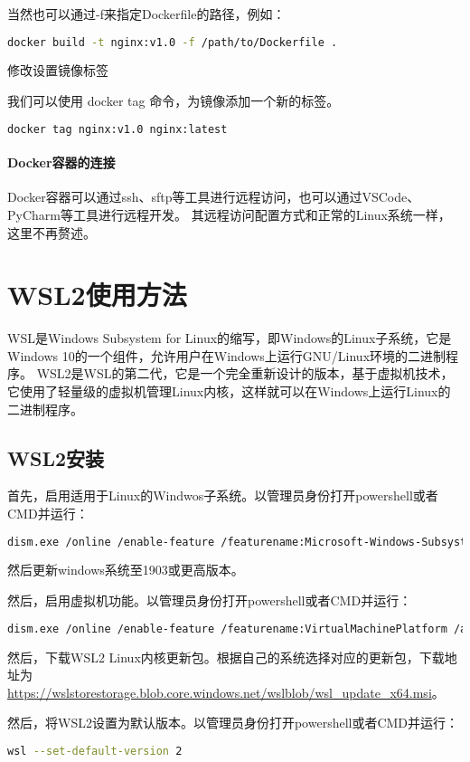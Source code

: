 \documentclass[lang=cn,a4paper,newtx]{elegantpaper}
\begin{document}
当然也可以通过-f来指定Dockerfile的路径，例如：
\begin{lstlisting}[language=bash]
  docker build -t nginx:v1.0 -f /path/to/Dockerfile .
\end{lstlisting}

修改设置镜像标签

我们可以使用 docker tag 命令，为镜像添加一个新的标签。
\begin{lstlisting}[language=bash]
  docker tag nginx:v1.0 nginx:latest
\end{lstlisting}

\paragraph{Docker容器的连接}
Docker容器可以通过ssh、sftp等工具进行远程访问，也可以通过VSCode、PyCharm等工具进行远程开发。
其远程访问配置方式和正常的Linux系统一样，这里不再赘述。
\section{WSL2使用方法}
WSL是Windows Subsystem for Linux的缩写，即Windows的Linux子系统，它是Windows 10的一个组件，允许用户在Windows上运行GNU/Linux环境的二进制程序。
WSL2是WSL的第二代，它是一个完全重新设计的版本，基于虚拟机技术，它使用了轻量级的虚拟机管理Linux内核，这样就可以在Windows上运行Linux的二进制程序。
\subsection{WSL2安装}
首先，启用适用于Linux的Windwos子系统。以管理员身份打开powershell或者CMD并运行：
\begin{lstlisting}[language=bash]
  dism.exe /online /enable-feature /featurename:Microsoft-Windows-Subsystem-Linux /all /norestart
\end{lstlisting}
然后更新windows系统至1903或更高版本。

然后，启用虚拟机功能。以管理员身份打开powershell或者CMD并运行：
\begin{lstlisting}[language=bash]
  dism.exe /online /enable-feature /featurename:VirtualMachinePlatform /all /norestart
\end{lstlisting}

然后，下载WSL2 Linux内核更新包。根据自己的系统选择对应的更新包，下载地址为\url{https://wslstorestorage.blob.core.windows.net/wslblob/wsl_update_x64.msi}。

然后，将WSL2设置为默认版本。以管理员身份打开powershell或者CMD并运行：
\begin{lstlisting}[language=bash]
  wsl --set-default-version 2
\end{lstlisting}
\end{document}
